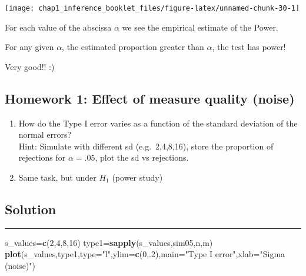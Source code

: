 \documentclass[]{article}
\newenvironment{Shaded}{\begin{snugshade}}{\end{snugshade}}
\newcommand{\KeywordTok}[1]{\textcolor[rgb]{0.13,0.29,0.53}{\textbf{#1}}}
\newcommand{\DataTypeTok}[1]{\textcolor[rgb]{0.13,0.29,0.53}{#1}}
\newcommand{\DecValTok}[1]{\textcolor[rgb]{0.00,0.00,0.81}{#1}}
\newcommand{\StringTok}[1]{\textcolor[rgb]{0.31,0.60,0.02}{#1}}
\newcommand{\ControlFlowTok}[1]{\textcolor[rgb]{0.13,0.29,0.53}{\textbf{#1}}}
\newcommand{\OperatorTok}[1]{\textcolor[rgb]{0.81,0.36,0.00}{\textbf{#1}}}
\newcommand{\NormalTok}[1]{#1}
\begin{document}
\begin{center}\texttt{[image: chap1\_inference\_booklet\_files/figure-latex/unnamed-chunk-30-1]} \end{center}

For each value of the abscissa \(\alpha\) we see the empirical estimate
of the Power.

For any given \(\alpha\), the estimated proportion greater than
\(\alpha\), the test has power!

Very good!! :)

\subsection{Homework 1: Effect of measure quality
(noise)}\label{homework-1-effect-of-measure-quality-noise}

\begin{enumerate}
\def\labelenumi{\arabic{enumi}.}
\item
  How do the Type I error varies as a function of the standard deviation
  of the normal errors?\\
  Hint: Simulate with different sd (e.g.~2,4,8,16), store the proportion
  of rejections for \(\alpha=.05\), plot the sd vs rejections.
\item
  Same task, but under \(H_1\) (power study)
\end{enumerate}

\subsection{Solution}\label{solution}

\begin{Shaded}
\end{Shaded}

\begin{center}\rule{0.5\linewidth}{\linethickness}\end{center}

\begin{Shaded}
\begin{Highlighting}[]
\NormalTok{s_values=}\KeywordTok{c}\NormalTok{(}\DecValTok{2}\NormalTok{,}\DecValTok{4}\NormalTok{,}\DecValTok{8}\NormalTok{,}\DecValTok{16}\NormalTok{)}
\NormalTok{type1=}\KeywordTok{sapply}\NormalTok{(s_values,sim05,n,m)}
\KeywordTok{plot}\NormalTok{(s_values,type1,}\DataTypeTok{type=}\StringTok{"l"}\NormalTok{,}\DataTypeTok{ylim=}\KeywordTok{c}\NormalTok{(}\DecValTok{0}\NormalTok{,.}\DecValTok{2}\NormalTok{),}\DataTypeTok{main=}\StringTok{"Type I error"}\NormalTok{,}\DataTypeTok{xlab=}\StringTok{"Sigma (noise)"}\NormalTok{)}
\end{Highlighting}
\end{Shaded}
\end{document}
